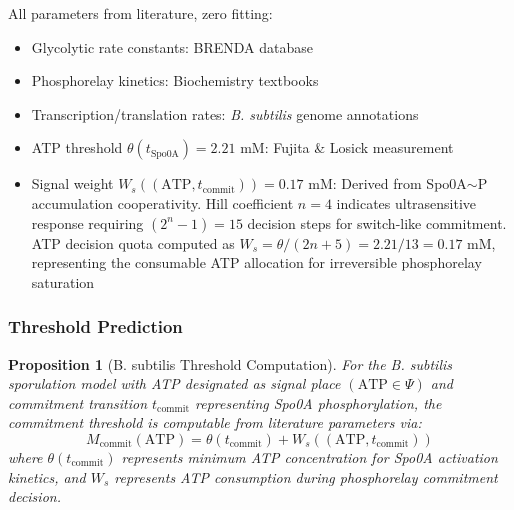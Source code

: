 \documentclass[10pt,letterpaper]{article}
\newtheorem{proposition}{Proposition}
\begin{document}
All parameters from literature, zero fitting:
\begin{itemize}
\item Glycolytic rate constants: BRENDA database \cite{schomburg2004}
\item Phosphorelay kinetics: Biochemistry textbooks \cite{voet2016}
\item Transcription/translation rates: \textit{B. subtilis} genome annotations \cite{barbe2009}
\item ATP threshold $\theta(t_{\text{Spo0A}}) = 2.21$ mM: Fujita \& Losick measurement
\item Signal weight $W_s((\text{ATP}, t_{\text{commit}})) = 0.17$ mM: Derived from Spo0A$\sim$P accumulation cooperativity. Hill coefficient $n=4$ indicates ultrasensitive response requiring $(2^n - 1) = 15$ decision steps for switch-like commitment. ATP decision quota computed as $W_s = \theta/(2n+5) = 2.21/13 = 0.17$ mM, representing the consumable ATP allocation for irreversible phosphorelay saturation \cite{ferrell1996}
\end{itemize}

\subsubsection{Threshold Prediction}

\begin{proposition}[B. subtilis Threshold Computation]
For the B. subtilis sporulation model with ATP designated as signal place $(\text{ATP} \in \Psi)$ and commitment transition $t_{\text{commit}}$ representing Spo0A phosphorylation, the commitment threshold is computable from literature parameters via:
\begin{equation}
M_{\text{commit}}(\text{ATP}) = \theta(t_{\text{commit}}) + W_s((\text{ATP}, t_{\text{commit}}))
\end{equation}
where $\theta(t_{\text{commit}})$ represents minimum ATP concentration for Spo0A activation kinetics, and $W_s$ represents ATP consumption during phosphorelay commitment decision.
\end{proposition}
\end{document}
